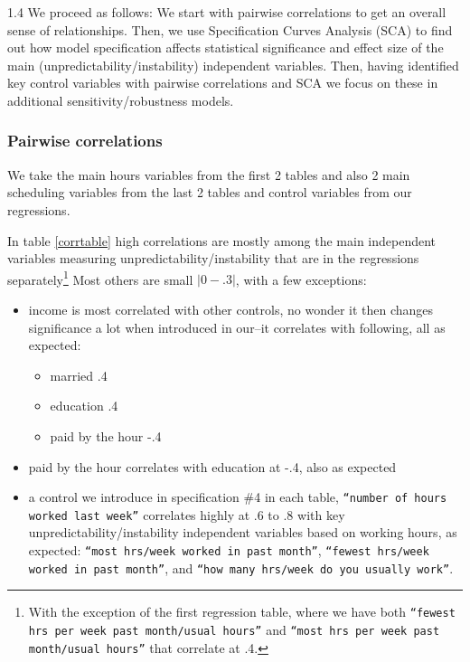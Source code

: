 \documentclass[10pt, letterpaper]{article}
\begin{document}
\begin{spacing}{1.4}
We proceed as follows: We start with pairwise correlations to get an overall
sense of relationships. Then, we use Specification Curves Analysis (SCA) to find
out how model specification affects statistical significance and effect size of the main (unpredictability/instability) independent variables. Then, having identified key
control variables with pairwise correlations and SCA we focus on these in additional sensitivity/robustness models. 

\subsubsection{Pairwise correlations}

We take the main hours variables from the first 2 tables and also 2 main scheduling
variables from the last 2 tables and control variables from our regressions. 

In table \ref{corrtable} high correlations are mostly among the main independent variables measuring unpredictability/instability that are in the regressions separately\footnote{With the exception of the first regression table, where we have both \texttt{``fewest hrs per week past
    month/usual hours''} and \texttt{``most hrs per week past month/usual
    hours''} that correlate at .4.}
Most others are small $|0-.3|$, with a few exceptions:
\begin{itemize}
\item income is most correlated with other controls, no wonder it then changes
  significance a lot when introduced in our--it correlates with following, all
  as expected:
  \begin{itemize}
  \item married .4
  \item education .4 
  \item paid by the hour -.4 
  \end{itemize}
\item paid by the hour correlates with  education at -.4, also as expected 
\item a control we introduce in specification \#4 in each table,
  \texttt{``number of hours worked last week''} correlates highly at .6 to .8 with key unpredictability/instability independent
  variables based on working hours, as expected: \texttt{``most hrs/week worked
    in past month''}, \texttt{``fewest hrs/week worked in past month''}, and
  \texttt{``how many hrs/week do you usually work''}.  
\end{itemize}



\end{spacing}
\end{document}
